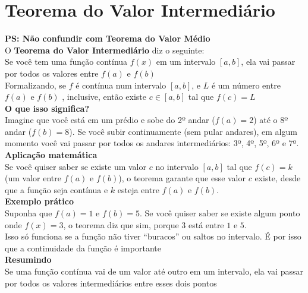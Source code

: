 \documentclass{article}
\begin{document}
\section{Teorema do Valor Intermediário}
\textbf{PS: Não confundir com Teorema do Valor Médio}
\\[10pt]
O \textbf{Teorema do Valor Intermediário} diz o seguinte:
\\[10pt]
Se você tem uma função contínua \( f(x) \) em um intervalo \([a, b]\), ela vai passar por todos os valores entre \( f(a) \) e \( f(b) \)
\\[10pt]
Formalizando, se $f$ é contínua num intervalo $[a, b]$, e $L$ é um número entre $f(a)$ e $f(b)$ , inclusive, então existe $c \in [a, b]$ tal que $f(c) = L$
\\[10pt]
\textbf{O que isso significa?}
\\[10pt]
Imagine que você está em um prédio e sobe do 2º andar (\( f(a) = 2 \)) até o 8º andar (\( f(b) = 8 \)). Se você subir continuamente (sem pular andares), em algum momento você vai passar por todos os andares intermediários: 3º, 4º, 5º, 6º e 7º.
\\[10pt]
\textbf{Aplicação matemática}
\\[10pt]
Se você quiser saber se existe um valor \( c \) no intervalo \([a, b]\) tal que \( f(c) = k \) (um valor entre \( f(a) \) e \( f(b) \)), o teorema garante que esse valor \( c \) existe, desde que a função seja contínua e \( k \) esteja entre \( f(a) \) e \( f(b) \).
\\[10pt]
\textbf{Exemplo prático}
\\[10pt]
Suponha que \( f(a) = 1 \) e \( f(b) = 5 \). Se você quiser saber se existe algum ponto onde \( f(x) = 3 \), o teorema diz que sim, porque \( 3 \) está entre \( 1 \) e \( 5 \).
\\[10pt]
Isso só funciona se a função não tiver ``buracos'' ou saltos no intervalo. É por isso que a continuidade da função é importante
\\[10pt]
\textbf{Resumindo}
\\[10pt]
Se uma função contínua vai de um valor até outro em um intervalo, ela vai passar por todos os valores intermediários entre esses dois pontos
\end{document}
